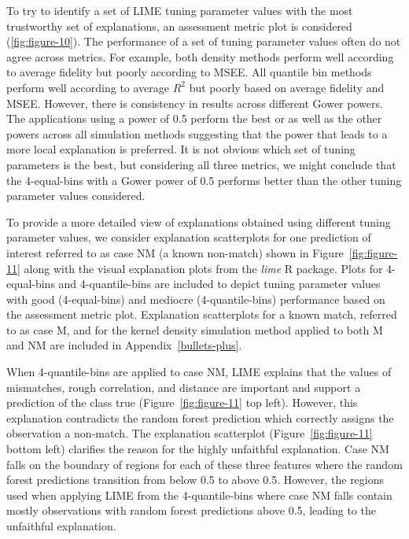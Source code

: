 \documentclass[AMS,STIX2COL]{WileyNJD-v2}\usepackage[]{graphicx}\usepackage[]{color}
\newcommand{\kge}[1]{\textcolor{teal}{#1}}
\begin{document}
To try to identify a set of LIME tuning parameter values with the most trustworthy set of explanations, an assessment metric plot is considered (\autoref{fig:figure-10}). The performance of a set of tuning parameter values often do not agree across metrics. For example, both density methods perform well according to average fidelity but poorly according to MSEE. All quantile bin methods perform well according to average $R^2$ but poorly based on average fidelity and MSEE. However, there is consistency in results across different Gower powers. The applications using a power of 0.5 perform the best or as well as the other powers across all simulation methods suggesting that the power that leads to a more local  explanation is preferred. It is not obvious  which set of tuning parameters is the best, but considering all three metrics, we might conclude that the 4-equal-bins with a Gower power of 0.5 performs better than the other tuning parameter values considered.

To provide a more detailed view of explanations obtained using different tuning parameter values, we consider explanation scatterplots for one prediction of interest  referred to as case NM (a known non-match) shown in Figure~\ref{fig:figure-11}  along with the visual  explanation plots from the \emph{lime} R package. Plots for 4-equal-bins and 4-quantile-bins are included to depict tuning parameter values with good (4-equal-bins) and mediocre (4-quantile-bins) performance based on the assessment metric plot. %
Explanation scatterplots for a known match, referred to as case M, and for the kernel density simulation method applied to both M and NM are included in Appendix~\ref{bullets-plus}. 

When 4-quantile-bins are applied to case NM, LIME explains that the values of mismatches, rough correlation, and distance are important and support a prediction of the class true (Figure~\ref{fig:figure-11} top left). However, this explanation contradicts the random forest prediction which correctly assigns the observation  a non-match. The explanation scatterplot (Figure~\ref{fig:figure-11} bottom left) clarifies the reason for the highly unfaithful explanation. Case NM falls on the boundary of regions for each of these three features where the random forest predictions transition from below 0.5 to above 0.5. However, the regions used when applying LIME from the 4-quantile-bins where case NM falls contain mostly observations with random forest predictions above 0.5, leading to the unfaithful explanation.
\end{document}
